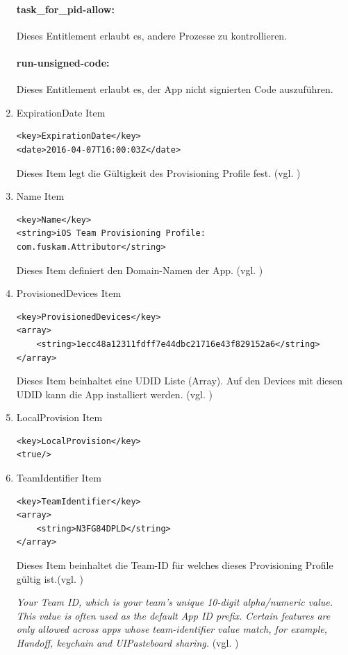 \begin{enumerate}
\paragraph{task\_for\_pid-allow:} Dieses Entitlement erlaubt es, andere Prozesse zu kontrollieren. 

\paragraph{run-unsigned-code:} Dieses Entitlement erlaubt es, der App nicht signierten Code auszuführen.

    \item ExpirationDate Item
\begin{lstlisting}[captionpos=b, caption={ExpirationDate Item}]
<key>ExpirationDate</key>
<date>2016-04-07T16:00:03Z</date>
\end{lstlisting}
Dieses Item legt die Gültigkeit des Provisioning Profile fest. (vgl. \cite{iOSSec[5], Hacking[1]})

    \item Name Item
\begin{lstlisting}[captionpos=b, caption={Name Item}]
<key>Name</key>
<string>iOS Team Provisioning Profile: com.fuskam.Attributor</string>
\end{lstlisting}
Dieses Item definiert den Domain-Namen der App. (vgl. \cite{iOSSec[5], Hacking[1]})

    \item ProvisionedDevices Item
\begin{lstlisting}[captionpos=b, caption={ProvisionedDevices Item}]
<key>ProvisionedDevices</key>
<array>
    <string>1ecc48a12311fdff7e44dbc21716e43f829152a6</string>
</array>
\end{lstlisting}
Dieses Item beinhaltet eine UDID Liste (Array). Auf den Devices mit diesen UDID kann die App installiert werden. (vgl. \cite{iOSSec[5], Hacking[1]})

  \item LocalProvision Item
\begin{lstlisting}[captionpos=b, caption={LocalProvision Item}]
<key>LocalProvision</key>
<true/>
\end{lstlisting}

    \item TeamIdentifier Item
\begin{lstlisting}[captionpos=b, caption={TeamIdentifier Item}]
<key>TeamIdentifier</key>
<array>
    <string>N3FG84DPLD</string>
</array>
\end{lstlisting}
Dieses Item beinhaltet die Team-ID für welches dieses Provisioning Profile gültig ist.(vgl. \cite{iOSSec[5], Hacking[1]}) \par
\glqq \textit{Your Team ID, which is your team's unique 10-digit alpha/numeric value. This value is often used as the default App ID prefix. Certain features are only allowed across apps whose team-identifier value match, for example, Handoff, keychain and UIPasteboard sharing.}\grqq{} (vgl. \cite{ProvisioningProfile[3]})


\end{enumerate}

